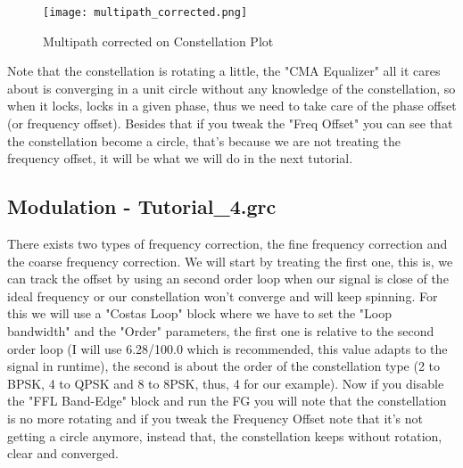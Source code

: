 \documentclass[a4paper, 10pt, conference]{ieeeconf}      %
\begin{document}
    \begin{figure}
        \centering
        \texttt{[image: multipath\_corrected.png]}
        \caption{Multipath corrected on Constellation Plot}
        \label{fig:multipath_corrected}
    \end{figure}
    
    Note that the constellation is rotating a little, the "CMA Equalizer" all it cares about is converging in a unit circle without any knowledge of the constellation, so when it locks, locks in a given phase, thus we need to take care of the phase offset (or frequency offset). Besides that if you tweak the "Freq Offset" you can see that the constellation become a circle, that's because we are not treating the frequency offset, it will be what we will do in the next tutorial.
    
\subsection{Modulation - Tutorial\_4.grc}
    There exists two types of frequency correction, the fine frequency correction and the coarse frequency correction. We will start by treating the first one, this is, we can track the offset by using an second order loop when our signal is close of the ideal frequency or our constellation won't converge and will keep spinning. For this we will use a "Costas Loop" block where we have to set the "Loop bandwidth" and the "Order" parameters, the first one is relative to the second order loop (I will use 6.28/100.0 which is recommended, this value adapts to the signal in runtime), the second is about the order of the constellation type (2 to BPSK, 4 to QPSK and 8 to 8PSK, thus, 4 for our example). Now if you disable the "FFL Band-Edge" block and run the FG you will note that the constellation is no more rotating and if you tweak the Frequency Offset note that it's not getting a circle anymore, instead that, the constellation keeps without rotation, clear and converged. 
    
\end{document}
